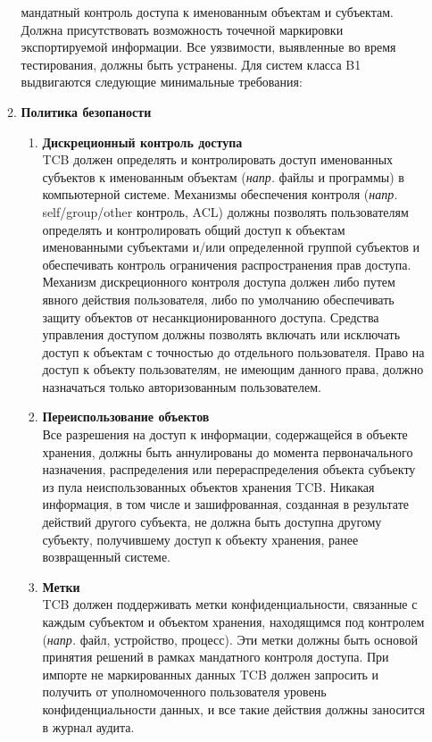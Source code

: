 \begin{enumerate}
\begin{enumerate}
		мандатный контроль доступа к именованным объектам и субъектам. Должна присутствовать возможность точечной маркировки экспортируемой информации. Все уязвимости, выявленные во время тестирования,
		должны быть устранены. Для систем класса B1 выдвигаются следующие минимальные требования:
		\item{\textbf{Политика безопаности}}
		\begin{enumerate}
			\item{\textbf{Дискреционный контроль доступа}}\\
			TCB должен определять и контролировать доступ именованных субъектов к именованным объектам (\textit{напр.} файлы и программы) в компьютерной системе. Механизмы обеспечения контроля
			(\textit{напр.} self/group/other контроль, ACL) должны позволять пользователям определять и контролировать общий доступ к объектам именованными субъектами и/или определенной группой
			субъектов и обеспечивать контроль ограничения распространения прав доступа. Механизм дискреционного контроля доступа должен либо путем явного действия пользователя, либо по умолчанию
			обеспечивать защиту объектов от несанкционированного доступа. Средства управления доступом должны позволять включать или исключать доступ к объектам с точностью до отдельного
			пользователя. Право на доступ к объекту пользователям, не имеющим данного права, должно назначаться только авторизованным пользователем.
			\item{\textbf{Переиспользование объектов}}\\
			Все разрешения на доступ к информации, содержащейся в объекте хранения, должны быть аннулированы до момента первоначального назначения, распределения или перераспределения объекта
			субъекту из пула неиспользованных объектов хранения TCB. Никакая информация, в том числе и зашифрованная, созданная в результате действий другого субъекта, не должна быть доступна
			другому субъекту, получившему доступ к объекту хранения, ранее возвращенный системе.
			\item{\textbf{Метки}}\\
			TCB должен поддерживать метки конфиденциальности, связанные с каждым субъектом и объектом хранения, находящимся под контролем (\textit{напр.} файл, устройство, процесс). Эти метки должны
			быть основой принятия решений в рамках мандатного контроля доступа. При импорте не маркированных данных TCB должен запросить и получить от уполномоченного пользователя уровень
			конфиденциальности данных, и все такие действия должны заносится в журнал аудита.
			\begin{itemize}

\end{itemize}
\end{enumerate}
\end{enumerate}
\end{enumerate}
